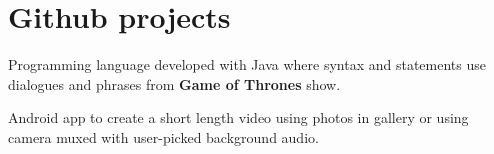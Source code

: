 \documentclass[a4paper]{srika-resume} %
\begin{document}
\begin{minipage}[t]{0.64\textwidth}
\sectionspace %



\section{Github projects}

\href{https://github.com/rsri/GamesOfThronesC}{}

Programming language developed with Java where syntax and statements use dialogues and phrases from \textbf{Game of Thrones} show.

\sectionspace %

\href{https://github.com/rsri/Pic2Fro}{}

Android app to create a short length video using photos in gallery or using camera muxed with user-picked background audio.

\sectionspace %


\end{minipage} %








\end{document}
